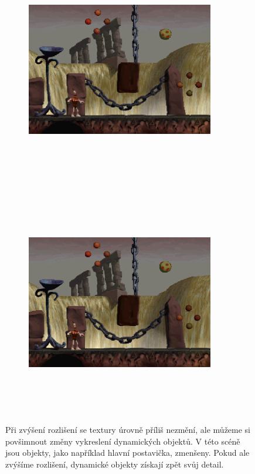 \begin{figure}[hbt]
    \centering
    \begin{subfigure}{0.9\textwidth}
        \centering
        \includegraphics[width=0.9\textwidth, height=10cm]{obrazky-figures/skull-lowres.png}
        \vspace*{2mm}
    \end{subfigure}
    \begin{subfigure}{0.9\textwidth}
        \centering
        \includegraphics[width=0.9\textwidth, height=10cm]{obrazky-figures/skull-highres.png}
    \end{subfigure}
    \caption[Změna rozlišení u hry \textit{Skullmonkeys}]{Při zvýšení rozlišení se textury úrovně příliš nezmění, ale můžeme si povšimnout změny vykreslení dynamických objektů. V této scéně jsou objekty, jako například hlavní postavička, zmenšeny. Pokud ale zvýšíme rozlišení, dynamické objekty získají zpět svůj detail.}
    \label{skullmonkeys-showcase-3}
\end{figure}

